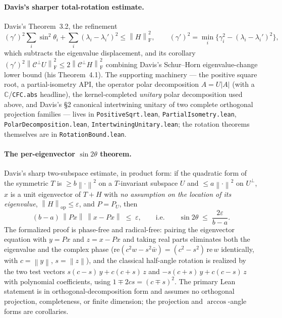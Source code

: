 \documentclass[11pt]{article}
\newcommand{\norm}[1]{\left\lVert #1\right\rVert}
\newcommand{\eps}{\varepsilon}
\newcommand{\F}{\mathrm{F}}
\newcommand{\op}{\mathrm{op}}
\theoremstyle{remark}
\begin{document}
\paragraph{Davis's sharper total-rotation estimate.}
Davis's Theorem~3.2, the refinement
\[
  (\gamma')^2\sum_i\sin^2\theta_i+\sum_i(\lambda_i-\lambda_i')^2
  \le\norm{H}_{\F}^2,
  \qquad
  (\gamma')^2=\min_i\bigl\{\gamma_i^2-(\lambda_i-\lambda_i')^2\bigr\},
\]
which subtracts the eigenvalue displacement, and its corollary
$(\gamma')^2\norm{\mathcal C^{\perp}U}_{\F}^2\le 2\norm{\mathcal
C^{\perp}H}_{\F}^2$ combining Davis's Schur--Horn eigenvalue-change lower bound
(his Theorem~4.1).  The supporting machinery --- the positive square root, a
partial-isometry API, the operator polar decomposition $A=U\lvert A\rvert$
(with a $\mathbb C$/\texttt{CFC.abs} headline), the kernel-completed
\emph{unitary} polar decomposition used above, and Davis's \S2 canonical
intertwining unitary of two complete orthogonal projection families --- lives
in \texttt{PositiveSqrt.lean}, \texttt{PartialIsometry.lean},
\texttt{PolarDecomposition.lean}, \texttt{IntertwiningUnitary.lean}; the
rotation theorems themselves are in \texttt{RotationBound.lean}.

\paragraph{The per-eigenvector $\sin2\theta$ theorem.}
Davis's sharp two-subspace estimate, in product form: if the quadratic form of
the symmetric $T$ is $\ge b\norm{\cdot}^2$ on a $T$-invariant subspace $U$ and
$\le a\norm{\cdot}^2$ on $U^{\perp}$, $x$ is a unit eigenvector of $T+H$ with
\emph{no assumption on the location of its eigenvalue}, $\norm{H}_{\op}\le\eps$,
and $P=P_U$, then
\[
  (b-a)\,\norm{Px}\,\norm{x-Px}\;\le\;\eps,
  \qquad\text{i.e.}\qquad
  \sin2\theta\;\le\;\frac{2\eps}{b-a}.
\]
The formalized proof is phase-free and radical-free: pairing the eigenvector
equation with $y=Px$ and $z=x-Px$ and taking real parts eliminates both the
eigenvalue and the complex phase
($\mathrm{re}(c^2w-s^2\bar w)=(c^2-s^2)\,\mathrm{re}\,w$ identically, with
$c=\norm{y}$, $s=\norm{z}$), and the classical half-angle rotation is realized
by the two test vectors $s(c-s)\,y+c(c+s)\,z$ and $-s(c+s)\,y+c(c-s)\,z$ with
polynomial coefficients, using $1\mp2cs=(c\mp s)^2$.  The primary Lean
statement is in orthogonal-decomposition form and assumes no orthogonal
projection, completeness, or finite dimension; the projection and
$\arccos$-angle forms are corollaries.
\end{document}

